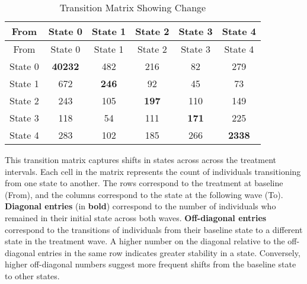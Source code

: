 \documentclass[
  single column]{article}
\begin{document}
\begin{longtable}[]{@{}cccccc@{}}
\caption{Transition Matrix Showing
Change}\label{tbl-transition}\tabularnewline
\toprule\noalign{}
From & State 0 & State 1 & State 2 & State 3 & State 4 \\
\midrule\noalign{}
\endfirsthead
\toprule\noalign{}
From & State 0 & State 1 & State 2 & State 3 & State 4 \\
\midrule\noalign{}
\endhead
\bottomrule\noalign{}
\endlastfoot
State 0 & \textbf{40232} & 482 & 216 & 82 & 279 \\
State 1 & 672 & \textbf{246} & 92 & 45 & 73 \\
State 2 & 243 & 105 & \textbf{197} & 110 & 149 \\
State 3 & 118 & 54 & 111 & \textbf{171} & 225 \\
State 4 & 283 & 102 & 185 & 266 & \textbf{2338} \\
\end{longtable}

This transition matrix captures shifts in states across across the
treatment intervals. Each cell in the matrix represents the count of
individuals transitioning from one state to another. The rows correspond
to the treatment at baseline (From), and the columns correspond to the
state at the following wave (To). \textbf{Diagonal entries} (in
\textbf{bold}) correspond to the number of individuals who remained in
their initial state across both waves. \textbf{Off-diagonal entries}
correspond to the transitions of individuals from their baseline state
to a different state in the treatment wave. A higher number on the
diagonal relative to the off-diagonal entries in the same row indicates
greater stability in a state. Conversely, higher off-diagonal numbers
suggest more frequent shifts from the baseline state to other states.
\end{document}
